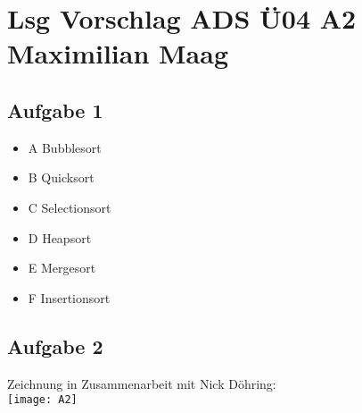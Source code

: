\documentclass{article}
\begin{document}
	\section*{Lsg Vorschlag ADS Ü04 A2 Maximilian Maag}
	\subsection*{Aufgabe 1}
	\begin{itemize}
		\item A Bubblesort
		\item B Quicksort
		\item C Selectionsort
		\item D Heapsort
		\item E Mergesort
		\item F Insertionsort
	\end{itemize}
	\subsection*{Aufgabe 2}
	Zeichnung in Zusammenarbeit mit Nick Döhring:  \\
	\texttt{[image: A2]}
\end{document}
